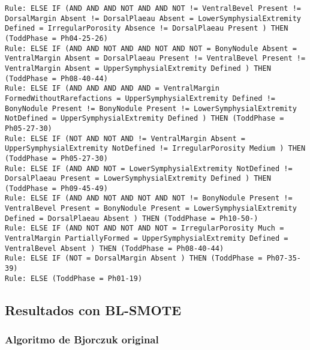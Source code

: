 \begin{lstlisting}
Rule: ELSE IF (AND AND AND NOT AND AND NOT != VentralBevel Present != DorsalMargin Absent != DorsalPlaeau Absent = LowerSymphysialExtremity Defined = IrregularPorosity Absence != DorsalPlaeau Present ) THEN (ToddPhase = Ph04-25-26)
Rule: ELSE IF (AND AND NOT AND AND NOT AND NOT = BonyNodule Absent = VentralMargin Absent = DorsalPlaeau Present != VentralBevel Present != VentralMargin Absent = UpperSymphysialExtremity Defined ) THEN (ToddPhase = Ph08-40-44)
Rule: ELSE IF (AND AND AND AND AND = VentralMargin FormedWithoutRarefactions = UpperSymphysialExtremity Defined != BonyNodule Present != BonyNodule Present != LowerSymphysialExtremity NotDefined = UpperSymphysialExtremity Defined ) THEN (ToddPhase = Ph05-27-30)
Rule: ELSE IF (NOT AND NOT AND != VentralMargin Absent = UpperSymphysialExtremity NotDefined != IrregularPorosity Medium ) THEN (ToddPhase = Ph05-27-30)
Rule: ELSE IF (AND AND NOT = LowerSymphysialExtremity NotDefined != DorsalPlaeau Present = LowerSymphysialExtremity Defined ) THEN (ToddPhase = Ph09-45-49)
Rule: ELSE IF (AND AND NOT AND NOT AND NOT != BonyNodule Present != VentralBevel Present = BonyNodule Present = LowerSymphysialExtremity Defined = DorsalPlaeau Absent ) THEN (ToddPhase = Ph10-50-)
Rule: ELSE IF (AND NOT AND NOT AND NOT = IrregularPorosity Much = VentralMargin PartiallyFormed = UpperSymphysialExtremity Defined = VentralBevel Absent ) THEN (ToddPhase = Ph08-40-44)
Rule: ELSE IF (NOT = DorsalMargin Absent ) THEN (ToddPhase = Ph07-35-39)
Rule: ELSE (ToddPhase = Ph01-19)
\end{lstlisting}




\subsection{Resultados con BL-SMOTE}

\subsubsection{Algoritmo de Bjorczuk original}

